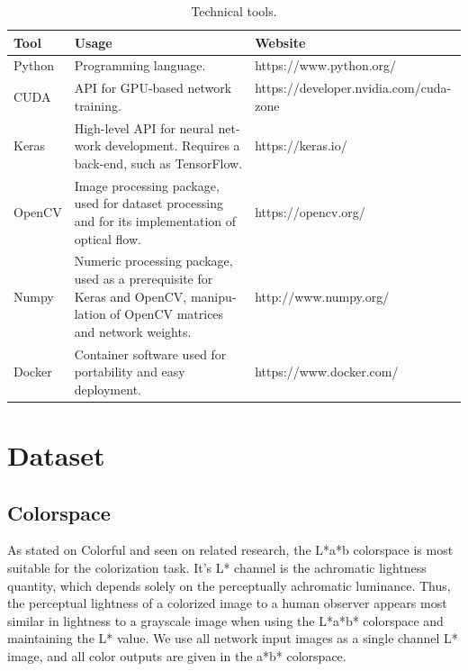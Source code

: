\documentclass[12pt,openright,oneside,a4paper,english]{abntex2}
\begin{document}
\begin{otherlanguage}{english}
\begin{table}[H]
    \centering
    \begin{tabular}{l|l|l|l}
    Tool            & \multicolumn{2}{l|}{Usage}                 & Website             \\ \hline
    Python          & \multicolumn{2}{p{6cm}|}{Programming language.} & https://www.python.org/ \\ \hline
    CUDA            & \multicolumn{2}{p{6cm}|}{API for GPU-based network training.}  & https://developer.nvidia.com/cuda-zone \\ \hline
    Keras           & \multicolumn{2}{p{6cm}|}{High-level API for neural network development. Requires a back-end, such as TensorFlow.}  & https://keras.io/   \\ \hline
    OpenCV          & \multicolumn{2}{p{6cm}|}{Image processing package, used for dataset processing and for its implementation of optical flow.}  & https://opencv.org/ \\ \hline
    Numpy           & \multicolumn{2}{p{6cm}|}{Numeric processing package, used as a prerequisite for Keras and OpenCV, manipulation of OpenCV matrices and network weights.}  & http://www.numpy.org/ \\ \hline
    Docker          &  \multicolumn{2}{p{6cm}|}{Container software used for portability and easy deployment.}  & https://www.docker.com/ \\ \hline
    \end{tabular}
    \label{table:tools}
    \caption{Technical tools.}
\end{table}

\section{Dataset}
\subsection{Colorspace}
As stated on Colorful \cite{colorful} and seen on related research, the L*a*b colorspace is most suitable for the colorization task. It's L* channel is the achromatic lightness quantity, which depends solely on the perceptually achromatic luminance. Thus, the perceptual lightness of a colorized image to a human observer appears most similar in lightness to a grayscale image when using the L*a*b* colorspace and maintaining the L* value. We use all network input images as a single channel L* image, and all color outputs are given in the a*b* colorspace.


\end{otherlanguage}
\end{document}
